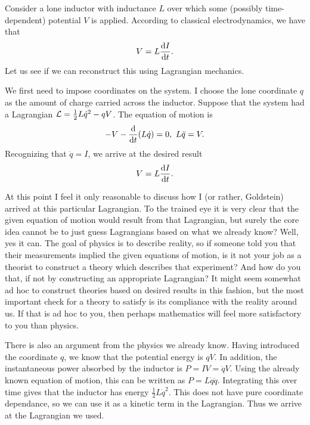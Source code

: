 Consider a lone inductor with inductance $L$ over which some (possibly time-dependent) potential $V$ is applied. According to classical electrodynamics, we have that
\begin{align*}
	V = L\dv{I}{t}.
\end{align*}
Let us see if we can reconstruct this using Lagrangian mechanics.

We first need to impose coordinates on the system. I choose the lone coordinate $q$ as the amount of charge carried across the inductor. Suppose that the system had a Lagrangian $\mathcal{L} = \frac{1}{2}L\dot{q}^{2} - qV$. The equation of motion is
\begin{align*}
	-V - \dv{t}(L\dot{q}) = 0,\ L\ddot{q} = V.
\end{align*}
Recognizing that $\dot{q} = I$, we arrive at the desired result
\begin{align*}
	V = L\dv{I}{t}.
\end{align*}

At this point I feel it only reasonable to discuss how I (or rather, Goldstein) arrived at this particular Lagrangian. To the trained eye it is very clear that the given equation of motion would result from that Lagrangian, but surely the core idea cannot be to just guess Lagrangians based on what we already know? Well, yes it can. The goal of physics is to describe reality, so if someone told you that their measurements implied the given equations of motion, is it not your job as a theorist to construct a theory which describes that experiment? And how do you that, if not by constructing an appropriate Lagrangian? It might seem somewhat ad hoc to construct theories based on desired results in this fashion, but the most important check for a theory to satisfy is its compliance with the reality around us. If that is ad hoc to you, then perhaps mathematics will feel more satisfactory to you than physics.

There is also an argument from the physics we already know. Having introduced the coordinate $q$, we know that the potential energy is $qV$. In addition, the instantaneous power absorbed by the inductor is $P = IV = \dot{q}V$. Using the already known equation of motion, this can be written as $P = L\dot{q}\ddot{q}$. Integrating this over time gives that the inductor has energy $\frac{1}{2}L\dot{q}^{2}$. This does not have pure coordinate dependance, so we can use it as a kinetic term in the Lagrangian. Thus we arrive at the Lagrangian we used.

